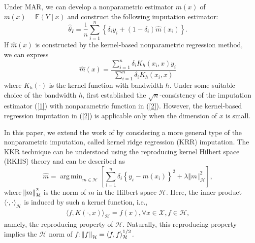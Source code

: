 \documentclass[12pt]{article}
\DeclareMathOperator*{\argmin}{arg\,min}
\newcommand{\bx}{{x}}
\def\wh{\widehat}
\newcommand{\Norm}[1]{\left\Vert#1\right\Vert}
\begin{document}
Under MAR, we can develop a nonparametric estimator $\wh{m} (\bx)$ of $m(\bx)=\mathbb{E}( Y \mid \bx)$ and construct the following imputation estimator: 
\begin{equation} 
\wh{\theta}_I = \frac{1}{n} \sum_{i=1}^n \left\{ \delta_i y_i + (1-\delta_i )\wh{m} (\bx_i) \right\}. 
\label{1} 
\end{equation} 
If $\wh{m} (\bx)$ is constructed by the kernel-based nonparametric regression method, we can express 
\begin{equation} 
 \wh{m} (\bx) = \frac{ \sum_{i=1}^n \delta_i K_h( \bx_i, \bx ) y_i}{ \sum_{i=1}^n \delta_i K_h( \bx_i, \bx )} 
\label{2}
\end{equation} 
where $K_h (\cdot)$ is the kernel function with bandwidth $h$. Under some suitable choice of the bandwidth $h$, \citet{cheng1994nonparametric} first established the $\sqrt{n}$-consistency of the imputation estimator (\ref{1}) with nonparametric  function in (\ref{2}).  However, the kernel-based regression imputation in (\ref{2}) is applicable only when the dimension of $x$ is small. 


%



In this paper, we extend the work of \citet{cheng1994nonparametric} by considering a more general type of the nonparametric imputation, called kernel ridge regression (KRR) imputation. The KKR technique can be understood using the reproducing kernel Hilbert space (RKHS) theory \citep{aronszajn1950theory} and can be described as 
\begin{equation} 
\wh{m} = \argmin_{m\in \mathcal{H}} \left[   \sum_{i=1}^{n} \delta_{i}\left\{ y_{i} - m(\bx_{i}) \right\}^{2} + \lambda \Norm{m}_{\mathcal{H}}^{2}   \right],
\label{3} 
\end{equation} 
where $ \norm{m}_{\mathcal{H}}^{2}  $ is the norm of $m$ in the Hilbert space $\mathcal{H}$. Here, the inner product $\langle \cdot, \cdot \rangle_{\mathcal{H}}$ is induced by {such} a kernel function, i.e., 
\begin{align}
\langle f, K(\cdot, \bx) \rangle_{\mathcal{H}} = f(\bx), \forall \bx \in \mathcal{X},  f\in \mathcal{H},
\end{align}
namely, the reproducing property of $\mathcal{H}$. Naturally, this  reproducing property implies the $\mathcal{H}$ norm of $f$: $\norm{f}_{\mathcal{H}} = \langle f, f  \rangle_{\mathcal{H}}^{1/2}$.
\end{document}

